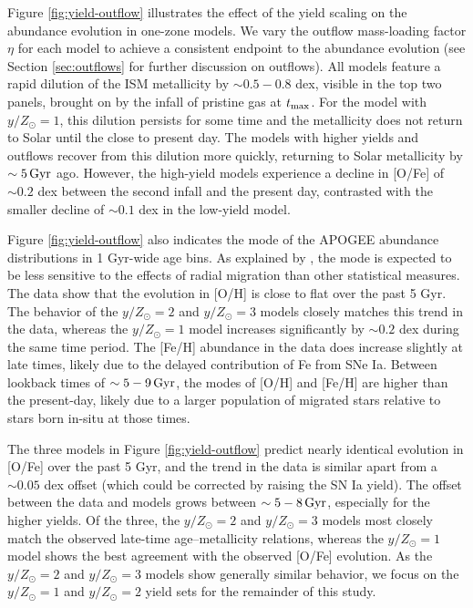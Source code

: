 \documentclass[twocolumn,twocolappendix,linenumbers]{aastex631}
\newcommand{\yZ}[1]{$y/Z_\odot=#1$}
\begin{document}
Figure \ref{fig:yield-outflow} illustrates the effect of the yield scaling on the abundance evolution in one-zone models. We vary the outflow mass-loading factor $\eta$ for each model to achieve a consistent endpoint to the abundance evolution (see Section \ref{sec:outflows} for further discussion on outflows). All models feature a rapid dilution of the ISM metallicity by $\sim0.5-0.8$ dex, visible in the top two panels, brought on by the infall of pristine gas at $t_{\rm max}$. For the model with $y/Z_\odot=1$, this dilution persists for some time and the metallicity does not return to Solar until the close to present day. The models with higher yields and outflows recover from this dilution more quickly, returning to Solar metallicity by $\sim5\,{\rm Gyr}$ ago. However, the high-yield models experience a decline in [O/Fe] of $\sim0.2$ dex between the second infall and the present day, contrasted with the smaller decline of $\sim0.1$ dex in the low-yield model.

Figure \ref{fig:yield-outflow} also indicates the mode of the APOGEE abundance distributions in 1 Gyr-wide age bins. As explained by \citet{johnson_milky_2024}, the mode is expected to be less sensitive to the effects of radial migration than other statistical measures. The data show that the evolution in [O/H] is close to flat over the past 5 Gyr. The behavior of the $y/Z_\odot=2$ and $y/Z_\odot=3$ models closely matches this trend in the data, whereas the $y/Z_\odot=1$ model increases significantly by $\sim0.2$ dex during the same time period. The [Fe/H] abundance in the data does increase slightly at late times, likely due to the delayed contribution of Fe from SNe Ia. Between lookback times of $\sim5-9\,{\rm Gyr}$, the modes of [O/H] and [Fe/H] are higher than the present-day, likely due to a larger population of migrated stars relative to stars born in-situ at those times. 

The three models in Figure \ref{fig:yield-outflow} predict nearly identical evolution in [O/Fe] over the past 5 Gyr, and the trend in the data is similar apart from a $\sim0.05$ dex offset (which could be corrected by raising the SN Ia yield). The offset between the data and models grows between $\sim5-8\,{\rm Gyr}$, especially for the higher yields. Of the three, the \yZ{2} and \yZ{3} models most closely match the observed late-time age--metallicity relations, whereas the \yZ{1} model shows the best agreement with the observed [O/Fe] evolution. As the \yZ{2} and \yZ{3} models show generally similar behavior, we focus on the \yZ{1} and \yZ{2} yield sets for the remainder of this study.
\end{document}
